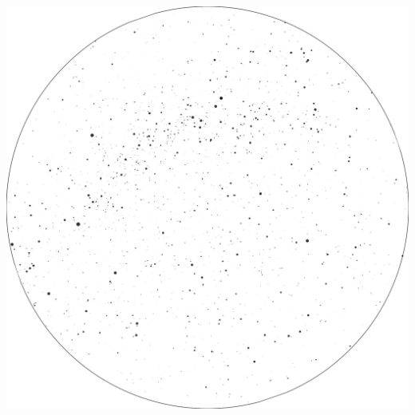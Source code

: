 \documentclass{./SAS-class-skygen}
\begin{document}
	\vspace{0.5cm}
    \begin{center}
    \includegraphics[width=\textwidth]{./pics/skychart38.png}
    \end{center}
    
    
\end{document}
